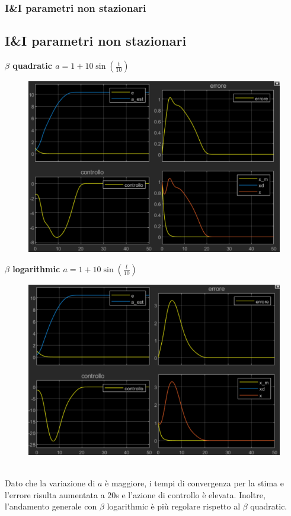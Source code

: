 \documentclass{beamer}
\begin{document}
\begin{frame}
	\frametitle{I\&I parametri non stazionari}
	\subsection{I\&I parametri non stazionari}
	\begin{minipage}[t]{0.45\textwidth}
		\textbf{\(\beta \) quadratic \(a=1+10\sin{(\frac{t}{10})}\)}
		\begin{figure}
			\includegraphics[scale=0.35]{2022-05-21-10-54-48.png} %
		\end{figure}
	\end{minipage}
	\begin{minipage}[t]{0.45\textwidth}
		\textbf{\(\beta \) logarithmic \( a=1+10\sin{(\frac{t}{10})}\)}
		\begin{figure}
			\includegraphics[scale=0.35]{2022-05-21-10-53-30.png} %
		\end{figure}
	\end{minipage}
	\vspace{0.1cm}\\
	Dato che la variazione di \(a\) è maggiore, i tempi di convergenza per la stima e l'errore risulta aumentata a 20s e l'azione di controllo è elevata. Inoltre, l'andamento generale con \(\beta \) logarithmic è più regolare rispetto al \(\beta \) quadratic.
\end{frame}
\end{document}
